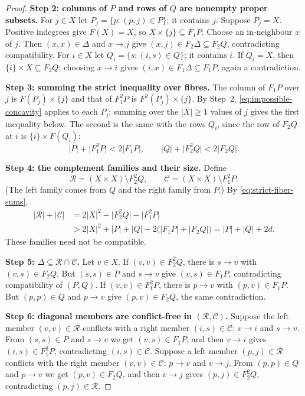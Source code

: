 \documentclass[11pt]{article}
\theoremstyle{remark}
\newcommand{\abs}[1]{\lvert #1\rvert}
\newcommand{\Step}[1]{\par\medskip\noindent\textbf{#1}\enspace}
\newcommand{\cR}{\mathcal R}
\newcommand{\cC}{\mathcal C}
\begin{document}
\begin{proof}
\Step{Step 2: columns of $P$ and rows of $Q$ are nonempty proper subsets.}
For $j\in X$ let $P_j=\{p:(p,j)\in P\}$; it contains $j$. Suppose $P_j=X$.
Positive indegrees give $F(X)=X$, so $X\times\{j\}\subseteq F_1P$. Choose an
in-neighbour $x$ of $j$. Then $(x,x)\in\Delta$ and $x\to j$ give
$(x,j)\in F_2\Delta\subseteq F_2Q$, contradicting compatibility.
For $i\in X$ let $Q_i=\{s:(i,s)\in Q\}$; it contains $i$. If $Q_i=X$, then
$\{i\}\times X\subseteq F_2Q$; choosing $x\to i$ gives
$(i,x)\in F_1\Delta\subseteq F_1P$, again a contradiction.

\Step{Step 3: summing the strict inequality over fibres.}
The column of $F_1P$ over $j$ is $F(P_j)\times\{j\}$ and that of $F_1^2P$
is $F^2(P_j)\times\{j\}$. By Step~2, \eqref{eq:impossible-concavity} applies
to each $P_j$; summing over the $\abs X\ge1$ values of $j$ gives the first
inequality below. The second is the same with the rows $Q_i$, since the row
of $F_2Q$ at $i$ is $\{i\}\times F(Q_i)$:
\begin{equation}\label{eq:strict-fiber-sums}
 \abs{P}+\abs{F_1^2P}<2\abs{F_1P},\qquad
 \abs{Q}+\abs{F_2^2Q}<2\abs{F_2Q}.
\end{equation}

\Step{Step 4: the complement families and their size.}
Define
\[
 \mathcal R=(X\times X)\setminus F_2^2Q,
 \qquad
 \mathcal C=(X\times X)\setminus F_1^2P .
\]
(The left family comes from $Q$ and the right family from $P$.)
By \eqref{eq:strict-fiber-sums},
\begin{equation}\label{eq:complement-gain}
 \begin{aligned}
 \abs{\mathcal R}+\abs{\mathcal C}
 &=2\abs{X}^2-\abs{F_2^2Q}-\abs{F_1^2P}\\
 &>2\abs{X}^2+\abs P+\abs Q-2\bigl(\abs{F_1P}+\abs{F_2Q}\bigr)
 =\abs P+\abs Q+2d.
 \end{aligned}
\end{equation}
These families need not be compatible.

\Step{Step 5: $\Delta\subseteq\cR\cap\cC$.}
Let $v\in X$. If $(v,v)\in F_2^2Q$, there is $s\to v$ with
$(v,s)\in F_2Q$. But $(s,s)\in P$ and $s\to v$ give $(v,s)\in F_1P$,
contradicting compatibility of $(P,Q)$. If $(v,v)\in F_1^2P$, there is
$p\to v$ with $(p,v)\in F_1P$. But $(p,p)\in Q$ and $p\to v$ give
$(p,v)\in F_2Q$, the same contradiction.

\Step{Step 6: diagonal members are conflict-free in $(\cR,\cC)$.}
Suppose the left member $(v,v)\in\cR$ conflicts with a right member
$(i,s)\in\cC$: $v\to i$ and $s\to v$. From $(s,s)\in P$ and $s\to v$ we
get $(v,s)\in F_1P$, and then $v\to i$ gives $(i,s)\in F_1^2P$,
contradicting $(i,s)\in\cC$. Suppose a left member $(p,j)\in\cR$ conflicts
with the right member $(v,v)\in\cC$: $p\to v$ and $v\to j$. From
$(p,p)\in Q$ and $p\to v$ we get $(p,v)\in F_2Q$, and then $v\to j$ gives
$(p,j)\in F_2^2Q$, contradicting $(p,j)\in\cR$.


\end{proof}
\end{document}
